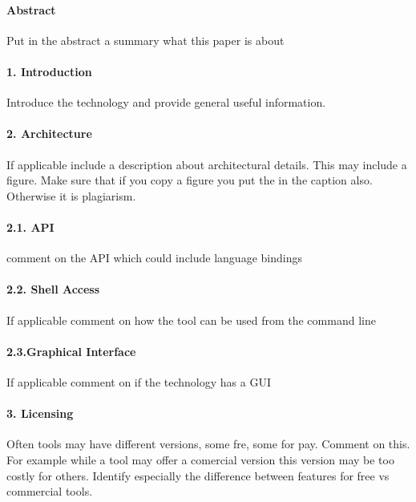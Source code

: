 \documentclass[9pt,twocolumn,twoside]{styles/osajnl}
\begin{document}
\paragraph{Abstract}

Put in the abstract a summary what this paper is about

\paragraph{1. Introduction}

Introduce the technology and provide general useful information.

\paragraph{2. Architecture} 

If applicable include a description about architectural details. This
may include a figure. Make sure that if you copy a figure you put the
\cite{?} in the caption also. Otherwise it is plagiarism.

\paragraph{2.1. API}

comment on the API which could include language bindings

\paragraph{2.2. Shell Access}

If applicable comment on how the tool can be used from the command line

\paragraph{2.3.Graphical Interface}

If applicable comment on if the technology has a GUI

\paragraph{3. Licensing}

Often tools may have different versions, some fre, some for
pay. Comment on this. For example while a tool may offer a comercial
version this version may be too costly for others. Identify especially
the difference between features for free vs commercial tools.
\end{document}
